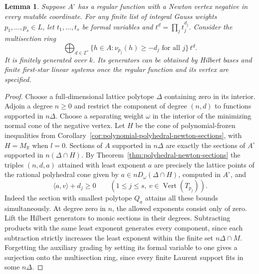 \documentclass[11pt,reqno]{amsart}
\numberwithin{equation}{section}
\newtheorem{lemma}[theorem]{Lemma}
\theoremstyle{definition}
\theoremstyle{remark}
\begin{document}
\begin{lemma}\label{lem:gauss-multisection-ring}
Suppose \(A^\circ\) has a regular function with a Newton vertex
negative in every mutable coordinate. For any finite list of integral
Gauss weights \(p_1,\ldots,p_s\in L\), let \(t_1,\ldots,t_s\) be
formal variables and \(t^d=\prod_j t_j^{d_j}\). Consider the multisection ring
\[ \bigoplus_{d\in\mathbb Z^s} \{h\in A:\nu_{p_j}(h)\ge-d_j\text{ for all }j\}\,t^d . \]
It is finitely generated over \(k\). Its generators can be obtained by Hilbert bases and finite first-star
linear systems once the regular function and its vertex are specified.
\end{lemma}
\begin{proof}
Choose a full-dimensional lattice polytope \(\Delta\) containing
zero in its interior. Adjoin a degree \(n\ge0\) and restrict the
component of degree \((n,d)\) to functions supported in \(n\Delta\).
Choose a separating weight \(\omega\) in the interior of the
minimizing normal cone of the negative vertex.
Let \(H\) be the cone of polynomial-frozen inequalities from
Corollary~\ref{cor:polynomial-polyhedral-newton-sections}, with
\(H=M_{\mathbb R}\) when \(l=0\). Sections of \(A\) supported in
\(n\Delta\) are exactly the sections of \(A^\circ\) supported in
\(n(\Delta\cap H)\). By Theorem~\ref{thm:polyhedral-newton-sections}
the triples \((n,d,a)\) attained with least exponent \(a\) are
precisely the lattice points of the rational polyhedral cone given
by \(a\in nD_\omega(\Delta\cap H)\), computed in \(A^\circ\), and
\[ \langle a,v\rangle+d_j\ge0 \qquad(1\le j\le s,\ v\in\operatorname{Vert}(T_{p_j})). \]
Indeed the section with smallest polytope \(Q_a\) attains all these
bounds simultaneously. At degree zero in \(n\), the allowed
exponents consist only of zero. Lift the Hilbert generators to
monic sections in their degrees. Subtracting products with the
same least exponent generates every component, since each
subtraction strictly increases the least exponent within the
finite set \(n\Delta\cap M\). Forgetting the auxiliary grading by
setting its formal variable to one gives a surjection onto the multisection ring,
since every finite Laurent support fits in some \(n\Delta\).
\end{proof}
\end{document}
